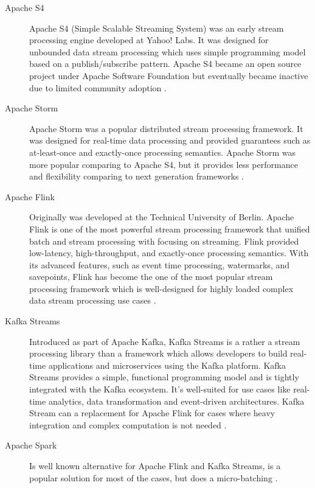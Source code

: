 \begin{description}
    \item[Apache S4]  Apache S4 (Simple Scalable Streaming System) was an early stream
    processing engine developed at Yahoo! Labs.
    It was designed for unbounded data stream processing which uses
    simple programming model based on a publish/subscribe pattern.
    Apache S4 became an open source project under Apache Software Foundation but
    eventually became inactive due to limited community adoption \cite{apache_s4_intro}.
    \item[Apache Storm]
    Apache Storm was a popular distributed stream processing framework.
    It was designed for real-time data processing and provided guarantees such as
    at-least-once and exactly-once processing semantics.
    Apache Storm was more popular comparing to Apache S4, but it provides less
    performance and flexibility comparing to next generation frameworks \cite{apache_storm_performance}.
    \item[Apache Flink] Originally was developed at the Technical University of Berlin.
    Apache Flink is one of the most powerful stream processing framework that unified batch and
    stream processing with focusing on streaming.
    Flink provided low-latency, high-throughput, and exactly-once processing semantics.
    With its advanced features, such as event time processing, watermarks, and savepoints,
    Flink has become the one of the most popular stream processing framework which is
    well-designed for highly loaded complex data stream processing use cases \cite{flink_intro}.
    \item[Kafka Streams] Introduced as part of Apache Kafka, Kafka Streams
    is a rather a stream processing library than a framework which allows developers to build real-time
    applications and microservices using the Kafka platform.
    Kafka Streams provides a simple, functional programming model and is tightly
    integrated with the Kafka ecosystem.
    It's well-suited for use cases like real-time analytics, data transformation
    and event-driven architectures.
    Kafka Stream can a replacement for Apache Flink for cases where heavy integration
    and complex computation is not needed \cite{kafka_streams_intro}.
    \item[Apache Spark] Is well known alternative for Apache Flink and Kafka Streams,
    is a popular solution for most of the cases, but does a micro-batching \cite{spark_structured_streaming}.
\end{description}

